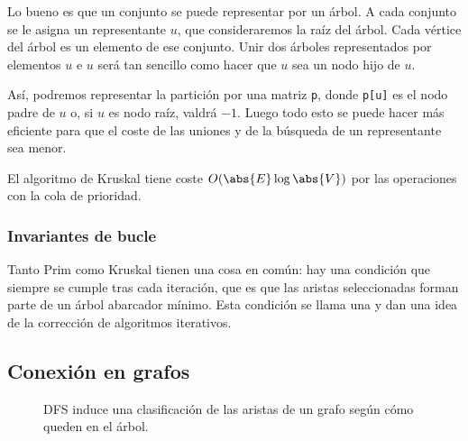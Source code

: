 \documentclass[palatino, nochap]{apuntes}
\begin{document}
Lo bueno es que un conjunto se puede representar por un árbol. A cada conjunto se le asigna un representante $u$, que consideraremos la raíz del árbol. Cada vértice del árbol es un elemento de ese conjunto. Unir dos árboles representados por elementos $u$ e $u$ será tan sencillo como hacer que $u$ sea un nodo hijo de $u$.

Así, podremos representar la partición por una matriz \texttt{p}, donde \texttt{p[u]} es el nodo padre de $u$ o, si $u$ es nodo raíz, valdrá $-1$. Luego todo esto se puede hacer más eficiente para que el coste de las uniones y de la búsqueda de un representante sea menor.

El algoritmo de Kruskal tiene coste $O(\abs{E} \log \abs{V})$ por las operaciones con la cola de prioridad.

\subsubsection{Invariantes de bucle}

Tanto Prim como Kruskal tienen una cosa en común: hay una condición que siempre se cumple tras cada iteración, que es que las aristas seleccionadas forman parte de un árbol abarcador mínimo. Esta condición se llama una  y dan una idea de la corrección de algoritmos iterativos.

\subsection{Conexión en grafos}

\begin{wrapfigure}{r}{0.35\textwidth}
\centering
{}
\caption{DFS induce una clasificación de las aristas de un grafo según cómo queden en el árbol.}
\label{fig:ArbolDFS}
\end{wrapfigure}
\end{document}
